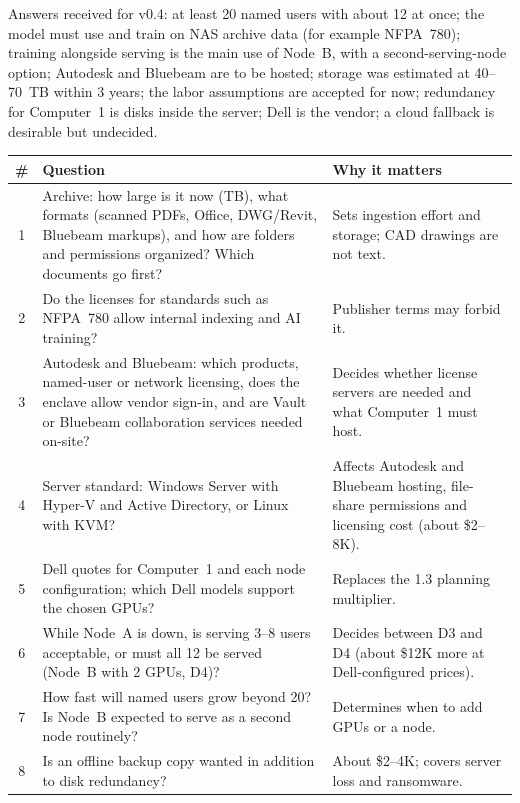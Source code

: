 
Answers received for v0.4: at least 20 named users with about 12 at once; the model must
use and train on NAS archive data (for example NFPA~780); training alongside serving is the
main use of Node~B, with a second-serving-node option; Autodesk and Bluebeam are to be
hosted; storage was estimated at 40--70~TB within 3 years; the labor assumptions are
accepted for now; redundancy for Computer~1 is disks inside the server; Dell is the
vendor; a cloud fallback is desirable but undecided.

{\footnotesize
\begin{xltabular}{\textwidth}{@{}c Y{1.231} Y{0.769}@{}}
  \toprule
  \# & Question & Why it matters \\
  \midrule
   & Archive: how large is it now (TB), what formats (scanned PDFs, Office, DWG/Revit, Bluebeam markups), and how are folders and permissions organized? Which documents go first? & Sets ingestion effort and storage; CAD drawings are not text. \\
  2 & Do the licenses for standards such as NFPA~780 allow internal indexing and AI training? & Publisher terms may forbid it. \\
  3 & Autodesk and Bluebeam: which products, named-user or network licensing, does the enclave allow vendor sign-in, and are Vault or Bluebeam collaboration services needed on-site? & Decides whether license servers are needed and what Computer~1 must host. \\
  4 & Server standard: Windows Server with Hyper-V and Active Directory, or Linux with KVM? & Affects Autodesk and Bluebeam hosting, file-share permissions and licensing cost (about \$2--8K). \\
  5 & Dell quotes for Computer~1 and each node configuration; which Dell models support the chosen GPUs? & Replaces the 1.3 planning multiplier. \\
  6 & While Node~A is down, is serving 3--8 users acceptable, or must all 12 be served (Node~B with 2 GPUs, D4)? & Decides between D3 and D4 (about \$12K more at Dell-configured prices). \\
  7 & How fast will named users grow beyond 20? Is Node~B expected to serve as a second node routinely? & Determines when to add GPUs or a node. \\
  8 & Is an offline backup copy wanted in addition to disk redundancy? & About \$2--4K; covers server loss and ransomware. \\

\end{xltabular}}

